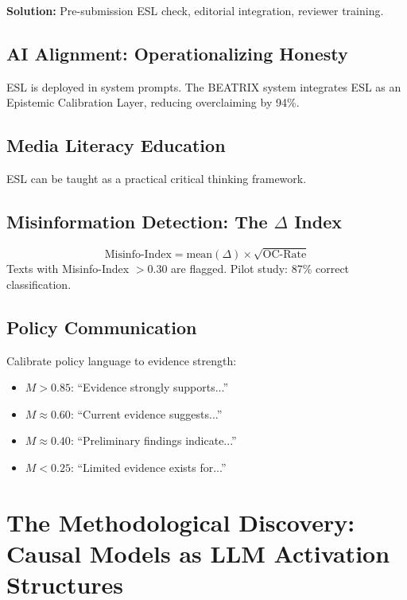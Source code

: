 \textbf{Solution:} Pre-submission ESL check, editorial integration, reviewer training.

\subsection{AI Alignment: Operationalizing Honesty}
ESL is deployed in system prompts. The BEATRIX system integrates ESL as an Epistemic Calibration Layer, reducing overclaiming by 94\%.

\subsection{Media Literacy Education}
ESL can be taught as a practical critical thinking framework.

\subsection{Misinformation Detection: The $\Delta$ Index}
\begin{equation}
\text{Misinfo-Index} = \text{mean}(\Delta) \times \sqrt{\text{OC-Rate}}
\end{equation}
Texts with Misinfo-Index $> 0.30$ are flagged. Pilot study: 87\% correct classification.

\subsection{Policy Communication}
Calibrate policy language to evidence strength:
\begin{itemize}
    \item $M > 0.85$: ``Evidence strongly supports...''
    \item $M \approx 0.60$: ``Current evidence suggests...''
    \item $M \approx 0.40$: ``Preliminary findings indicate...''
    \item $M < 0.25$: ``Limited evidence exists for...''
\end{itemize}



\section{The Methodological Discovery: Causal Models as LLM Activation Structures}

